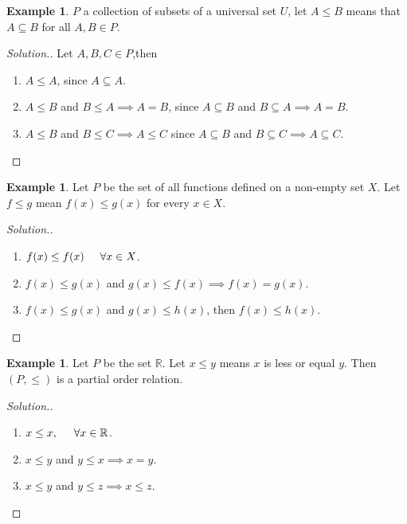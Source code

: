 \documentclass[11pt,a4paper]{article}
\theoremstyle{definition}
\newtheorem{exa}[thm]{Example}
\newenvironment{solution}
  {\renewcommand{\qedsymbol}{}\begin{proof}[\textit{Solution}.]}
  {\end{proof}}
\begin{document}
\begin{exa}
$P$ a collection of subsets of a universal set $U$, let $A\leq B$ means that $A\subseteq B$ for all $A,B\in P$.

\end{exa}
\begin{solution}
Let $A,B,C\in P$,then 
\begin{enumerate}
\item[i] $A\leq A$, since $A\subseteq A$.
\item[ii] $A\leq B$ and $B\leq A\implies A=B$, since $A\subseteq B$ and $B\subseteq A\implies A=B$.
\item[iii] $A\leq B$ and $B\leq C\implies A\leq C$ since $A\subseteq B$ and $B\subseteq C\implies A\subseteq C$.
\end{enumerate}
\end{solution}

\begin{exa}
Let $P$ be the set of all functions defined on a non-empty set $X$. Let $f\leq g$ mean $f(x)\leq g(x)$ for every $x\in X$.

\end{exa}
\begin{solution}
\begin{enumerate}
\item[i] $f(x)\leq f(x)\hspace{0.5cm} \forall x\in X$.
\item[ii] $f(x)\leq g(x)$ and $g(x)\leq f(x)\implies f(x)=g(x)$.
\item[iii] $f(x)\leq g(x)$ and $g(x)\leq h(x)$, then $f(x)\leq h(x)$.
\end{enumerate}
\end{solution}


\begin{exa}
Let $P$ be the set $\mathbb{R}$. Let $x\leq y$ means $x$ is less or equal $y$. Then $(P,\leq)$ is a partial order relation.

\end{exa}


\begin{solution}
\begin{enumerate}
\item[i] $x\leq x,\hspace{0.5cm} \forall x\in \mathbb{R}$.
\item[ii] $x\leq y$ and $y\leq x\implies x=y$.
\item[iii] $x\leq y$ and $y\leq z\implies x\leq z$.
\end{enumerate}
\end{solution}
\end{document}

